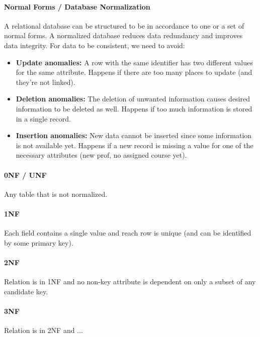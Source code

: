 \paragraph{Normal Forms / Database Normalization}
A relational database can be structured to be in accordance to one or a set of normal forms. A normalized database reduces data redundancy and improves data integrity. For data to be consistent, we need to avoid:
\begin{itemize}
    \item \textbf{Update anomalies:} A row with the same identifier has two different values for the same attribute. Happens if there are too many places to update (and they're not linked).
    \item \textbf{Deletion anomalies:} The deletion of unwanted information causes desired information to be deleted as well. Happens if too much information is stored in a single record. 
    \item \textbf{Insertion anomalies:} New data cannot be inserted since some information is not available yet. Happens if a new record is missing a value for one of the necessary attributes (new prof, no assigned course yet).
\end{itemize}



\paragraph{0NF / UNF}
Any table that is not normalized.

\paragraph{1NF}
Each field contains a single value and reach row is unique (and can be identified by some primary key).

\paragraph{2NF}
Relation is in 1NF and no non-key attribute is dependent on only a subset of any candidate key.

\paragraph{3NF}
Relation is in 2NF and ...



